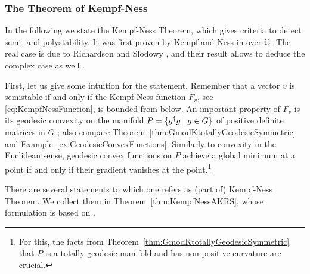 \subsubsection{The Theorem of Kempf-Ness}

In the following we state the Kempf-Ness Theorem, which gives criteria to detect semi- and polystability. It was first proven by Kempf and Ness in \cite{KempfNess} over $\mathbb C$. The real case is due to Richardson and Slodowy \cite{RichardsonSlodowy}, and their result allows to deduce the complex case as well \cite[Remark~4.5(d)]{RichardsonSlodowy}.

\medskip


First, let us give some intuition for the statement. 
Remember that a vector $v$ is semistable if and only if the Kempf-Ness function $F_v$, see \eqref{eq:KempfNessFunction}, is bounded from below.
An important property of $F_v$ is its geodesic convexity on the manifold $P = \{ g^{\dagger} g \mid g \in G \}$ of positive definite matrices in $G$ \cite[Proposition~3.13]{GradflowArXiv}; also compare Theorem~\ref{thm:GmodKtotallyGeodesicSymmetric} and Example~\ref{ex:GeodesicConvexFunctions}. Similarly to convexity in the Euclidean sense, geodesic convex functions on $P$ achieve a global minimum at a point if and only if their gradient vanishes at the point.\footnote{For this, the facts from Theorem~\ref{thm:GmodKtotallyGeodesicSymmetric} that $P$ is a totally geodesic manifold and has non-positive curvature are crucial.}

There are several statements to which one refers as (part of) Kempf-Ness Theorem. We collect them in Theorem~\ref{thm:KempfNessAKRS}, whose formulation is based on \cite[Theorem~2.2]{SiagaPaper}.

